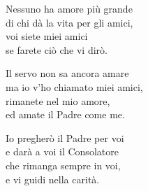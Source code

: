 

\spazio

\strofa Nessuno ha amore più grande\\
di chi dà la vita per gli amici,\\
voi siete miei amici\\
se farete ciò che vi dirò.

\spazio


\spazio

\strofa Il servo non sa ancora amare\\
ma io v'ho chiamato miei amici,\\
rimanete nel mio amore,\\
ed amate il Padre come me.

\spazio


\spazio

\strofa Io pregherò il Padre per voi\\
e darà a voi il Consolatore\\
che rimanga sempre in voi,\\
e vi guidi nella carità.

\spazio

